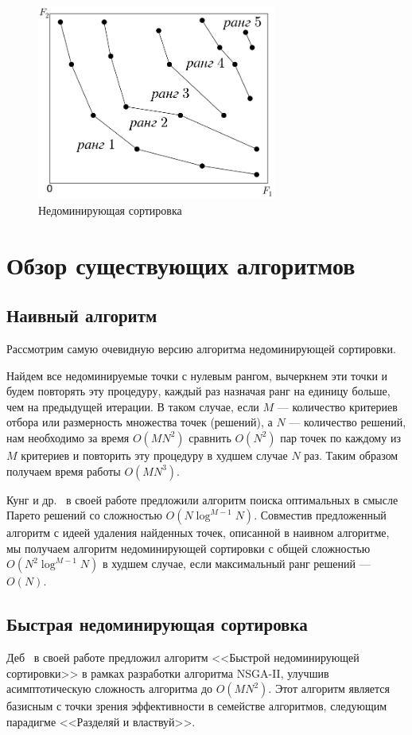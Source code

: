 \begin{figure}[h]
\centering
\includegraphics[width=0.7\textwidth]{images/nds.png}
\caption{Недоминирующая сортировка}
\label{pic0}
\end{figure}

\section{Обзор существующих алгоритмов}
\subsection{Наивный алгоритм}
Рассмотрим самую очевидную версию алгоритма недоминирующей сортировки.

Найдем все недоминируемые точки с нулевым рангом, вычеркнем эти точки и будем повторять эту процедуру, каждый раз назначая ранг на единицу больше, чем на предыдущей итерации.
В таком случае, если $M$ --- количество критериев отбора или размерность множества точек (решений), а $N$ --- количество решений, нам необходимо за время $O(MN^2)$ сравнить $O(N^2)$ пар точек по каждому из $M$ критериев и повторить эту процедуру в худшем случае $N$ раз.
Таким образом получаем время работы $O(MN^3)$.

Кунг и др.~\cite{kung75} в своей работе предложили алгоритм поиска оптимальных в смысле Парето решений со сложностью $O(N\log^{M-1}N)$.
Совместив предложенный алгоритм с идеей удаления найденных точек, описанной в наивном алгоритме, мы получаем алгоритм недоминирующей сортировки с общей сложностью $O(N^2\log^{M-1}N)$ в худшем случае, если максимальный ранг решений --- $O(N)$.

\subsection{Быстрая недоминирующая сортировка}
Деб~\cite{deb00} в своей работе предложил алгоритм <<Быстрой недоминирующей сортировки>> в рамках разработки алгоритма NSGA-II, улучшив асимптотическую сложность алгоритма до $O(MN^2)$.
Этот алгоритм является базисным с точки зрения эффективности в семействе алгоритмов, следующим парадигме <<Разделяй и властвуй>>.

